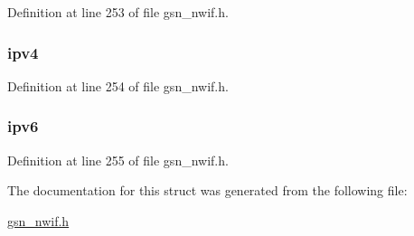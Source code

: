 Definition at line 253 of file gsn\_\-nwif.h.

\hypertarget{a00172_afe4dd480490754207d7a4bfff0ae847e}{
\subsubsection[{ipv4}]{ {\bf ipv4}}}
\label{a00172_afe4dd480490754207d7a4bfff0ae847e}


Definition at line 254 of file gsn\_\-nwif.h.

\hypertarget{a00172_a287dc5eb930eaa525053f2faef9c499d}{
\subsubsection[{ipv6}]{ {\bf ipv6}}}
\label{a00172_a287dc5eb930eaa525053f2faef9c499d}


Definition at line 255 of file gsn\_\-nwif.h.



The documentation for this struct was generated from the following file:\begin{DoxyCompactItemize}
\item 
\hyperlink{a00534}{gsn\_\-nwif.h}\end{DoxyCompactItemize}

